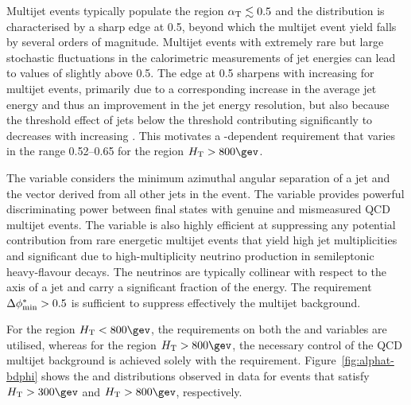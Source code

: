 Multijet events typically populate the region $\alphat \lesssim 0.5$
and the \alphat distribution is characterised by a sharp edge at 0.5,
beyond which the multijet event yield falls by several orders of
magnitude. Multijet events with extremely rare but large stochastic
fluctuations in the calorimetric measurements of jet energies can lead
to values of \alphat slightly above 0.5. The edge at 0.5 sharpens with
increasing \scalht for multijet events, primarily due to a
corresponding increase in the average jet energy and thus an
improvement in the jet energy resolution, but also because the
threshold effect of jets below the \Pt threshold contributing
significantly to \mht decreases with increasing \scalht. This
motivates a \scalht-dependent \alphat requirement that varies in the
range 0.52--0.65 for the region $\scalht > 800\gev$. 

The \dphi variable considers the minimum azimuthal angular separation
of a jet and the \mht vector derived from all other jets in the
event. The \dphi variable provides powerful discriminating power
between final states with genuine \ETmiss and mismeasured QCD multijet
events. The variable is also highly efficient at suppressing any
potential contribution from rare energetic multijet events that yield
high jet multiplicities and significant \ETmiss due to
high-multiplicity neutrino production in semileptonic heavy-flavour
decays. The neutrinos are typically collinear with respect to the axis
of a jet and carry a significant fraction of the energy. The
requirement $\dphi > 0.5$ is sufficient to suppress effectively the
multijet background. 

For the region $\scalht < 800\gev$, the requirements on both the
\alphat and \dphi variables are utilised, whereas for the region
$\scalht > 800\gev$, the necessary control of the QCD multijet
background is achieved solely with the \dphi
requirement. Figure~\ref{fig:alphat-bdphi} shows the \alphat and \dphi
distributions observed in data for events that satisfy $\scalht >
300\gev$ and $\scalht > 800\gev$, respectively.

